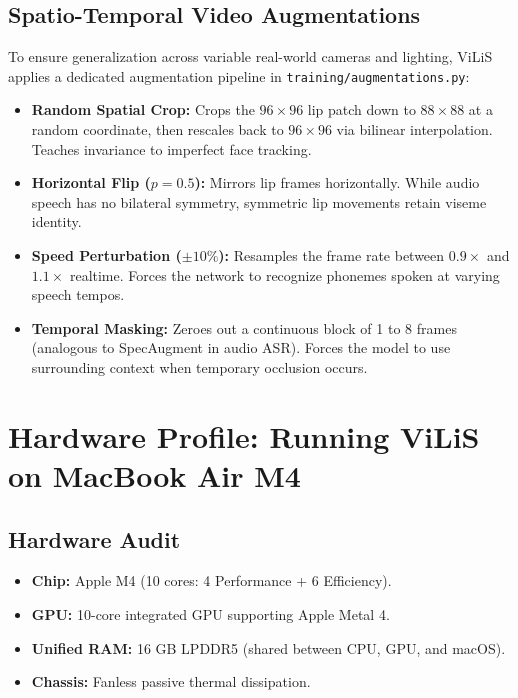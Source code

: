 \documentclass[11pt,a4paper]{article}
\begin{document}
\subsection{Spatio-Temporal Video Augmentations}
To ensure generalization across variable real-world cameras and lighting, ViLiS applies a dedicated augmentation pipeline in \texttt{training/augmentations.py}:
\begin{itemize}
    \item \textbf{Random Spatial Crop:} Crops the $96 \times 96$ lip patch down to $88 \times 88$ at a random coordinate, then rescales back to $96 \times 96$ via bilinear interpolation. Teaches invariance to imperfect face tracking.
    \item \textbf{Horizontal Flip ($p=0.5$):} Mirrors lip frames horizontally. While audio speech has no bilateral symmetry, symmetric lip movements retain viseme identity.
    \item \textbf{Speed Perturbation ($\pm 10\%$):} Resamples the frame rate between $0.9\times$ and $1.1\times$ realtime. Forces the network to recognize phonemes spoken at varying speech tempos.
    \item \textbf{Temporal Masking:} Zeroes out a continuous block of 1 to 8 frames (analogous to SpecAugment in audio ASR). Forces the model to use surrounding context when temporary occlusion occurs.
\end{itemize}

\section{Hardware Profile: Running ViLiS on MacBook Air M4}
\subsection{Hardware Audit}
\begin{itemize}
    \item \textbf{Chip:} Apple M4 (10 cores: 4 Performance + 6 Efficiency).
    \item \textbf{GPU:} 10-core integrated GPU supporting Apple Metal 4.
    \item \textbf{Unified RAM:} 16 GB LPDDR5 (shared between CPU, GPU, and macOS).
    \item \textbf{Chassis:} Fanless passive thermal dissipation.
\end{itemize}
\end{document}
